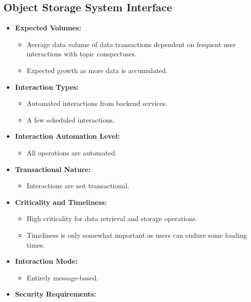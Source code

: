 \subsection*{Object Storage System Interface}
\begin{itemize}
    \item \textbf{Expected Volumes:}
          \begin{itemize}
              \item Average data volume of data transactions dependent on frequent user interactions with topic conspectuses.
              \item Expected growth as more data is accumulated.
          \end{itemize}
    \item \textbf{Interaction Types:}
          \begin{itemize}
              \item Automated interactions from backend services.
              \item A few scheduled interactions.
          \end{itemize}
    \item \textbf{Interaction Automation Level:}
          \begin{itemize}
              \item All operations are automated.
          \end{itemize}
    \item \textbf{Transactional Nature:}
          \begin{itemize}
              \item Interactions are not transactional.
          \end{itemize}
    \item \textbf{Criticality and Timeliness:}
          \begin{itemize}
              \item High criticality for data retrieval and storage operations.
              \item Timeliness is only somewhat important as users can endure some loading times.
          \end{itemize}
    \item \textbf{Interaction Mode:}
          \begin{itemize}
              \item Entirely message-based.
          \end{itemize}
    \item \textbf{Security Requirements:}

\end{itemize}
